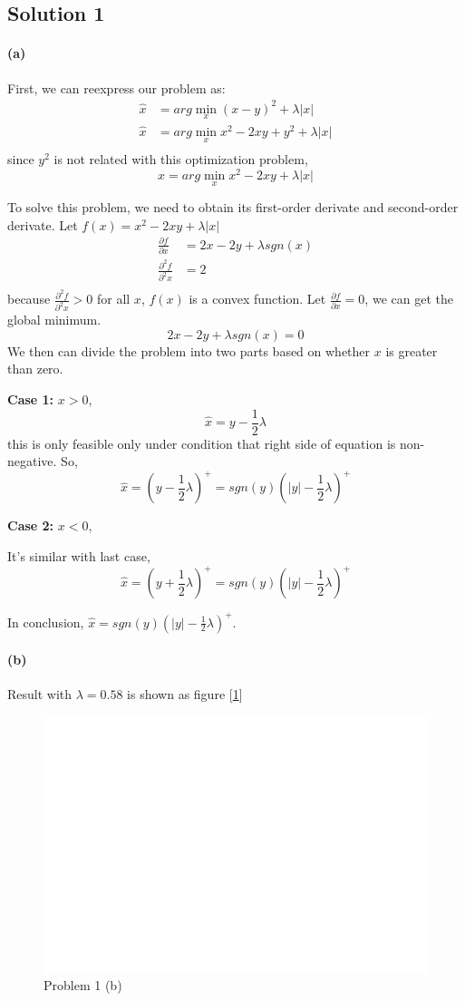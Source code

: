 \documentclass{article}
\newcommand{\solution}[1]{\clearpage \subsection*{Solution #1}}
\newcommand{\spart}[1]{\paragraph{(#1)}}
\begin{document}

\solution{1} 

\spart{a} First, we can reexpress our problem as:
$$
\begin{aligned}
  \hat{x} & = arg \min_x (x-y)^2 + \lambda|x| \\
  \hat{x} & = arg \min_x x^2 -2xy + y^2 + \lambda|x| \\
\end{aligned}
$$
since $y^2$ is not related with this optimization problem,
$$
  \hat{x} = arg \min_x x^2 -2xy + \lambda|x|
$$

To solve this problem, we need to obtain its first-order derivate and second-order derivate.
Let $f(x) = x^2 -2xy + \lambda|x| $
$$
  \begin{aligned}
    \frac{\partial f}{\partial x} & = 2x - 2y + \lambda sgn(x) \\
    \frac{\partial^2 f}{\partial^2 x} & = 2 \\
  \end{aligned}
$$
because $\frac{\partial^2 f}{\partial^2 x} > 0$ for all $x$, $f(x)$ is a convex function.
Let $\frac{\partial f}{\partial x} = 0$, we can get the global minimum.
$$
    2x - 2y + \lambda sgn(x) = 0
$$
We then can divide the problem into two parts based on whether $x$ is greater than zero.

\textbf{Case 1:} $x > 0$,
$$
  \hat{x} = y - \frac{1}{2}\lambda
$$ 
this is only feasible only under condition that right side of equation is non-negative. So,
$$
  \hat{x} = {(y - \frac{1}{2}\lambda)}^{+} = sgn(y){(|y| - \frac{1}{2}\lambda)}^{+}
$$ 

\textbf{Case 2:} $x < 0$,

It's similar with last case,
$$
  \hat{x} = {(y + \frac{1}{2}\lambda)}^{+} = sgn(y){(|y| - \frac{1}{2}\lambda)}^{+}
$$ 

In conclusion, $\hat{x} = sgn(y){(|y| - \frac{1}{2}\lambda)}^{+}$.

\spart{b} Result with $\lambda = 0.58$ is shown as figure [\ref{fig:1b}]
\begin{figure}[htbp]
  \centering
  \includegraphics[width = .7\textwidth]{./code/outputs/prob1.png}
  \caption{Problem 1 (b)}
  \label{fig:1b}
\end{figure}
\end{document}
